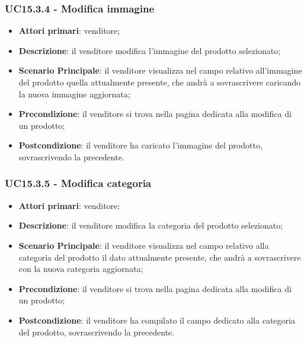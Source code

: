 \subsubsection{UC15.3.4 - Modifica immagine}
\begin{itemize}
\item \textbf{Attori primari}: venditore;
\item \textbf{Descrizione}: il venditore modifica l'immagine del prodotto selezionato;
\item \textbf{Scenario Principale}: il venditore visualizza nel campo relativo all'immagine del prodotto quella attualmente presente, che andrà a sovrascrivere caricando la nuova immagine aggiornata;
\item \textbf{Precondizione}: il venditore si trova nella pagina dedicata alla modifica di un prodotto;
\item \textbf{Postcondizione}: il venditore ha caricato l'immagine del prodotto, sovrascrivendo la precedente.
\end{itemize}

\subsubsection{UC15.3.5 - Modifica categoria}
\begin{itemize}
\item \textbf{Attori primari}: venditore;
\item \textbf{Descrizione}: il venditore modifica la categoria del prodotto selezionato;
\item \textbf{Scenario Principale}: il venditore visualizza nel campo relativo alla categoria del prodotto il dato attualmente presente, che andrà a sovrascrivere con la nuova categoria aggiornata;
\item \textbf{Precondizione}: il venditore si trova nella pagina dedicata alla modifica di un prodotto;
\item \textbf{Postcondizione}: il venditore ha compilato il campo dedicato alla categoria del prodotto, sovrascrivendo la precedente.
\end{itemize}

